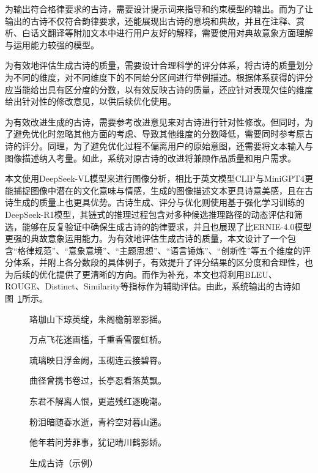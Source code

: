 为输出符合格律要求的古诗，需要设计提示词来指导和约束模型的输出。而为了让输出的古诗不仅符合韵律要求，还能展现出古诗的意境和典故，并且在注释、赏析、白话文翻译等附加文本中进行用户友好的解释，需要使用对典故意象方面理解与运用能力较强的模型。

为有效地评估生成古诗的质量，需要设计合理科学的评分体系，将古诗的质量划分为不同的维度，对不同维度下的不同给分区间进行举例描述。根据体系获得的评分应当能给出具有区分度的分数，以有效反映古诗的质量，还应针对表现欠佳的维度给出针对性的修改意见，以供后续优化使用。

为有效改进生成的古诗，需要参考改进意见来对古诗进行针对性修改。但同时，为了避免优化时忽略其他方面的考虑、导致其他维度的分数降低，需要同时参考原古诗的评分。同理，为了避免优化过程不偏离用户的原始意图，还需要将文本输入与图像描述纳入考量。如此，系统对原古诗的改进将兼顾作品质量和用户需求。

本文使用DeepSeek-VL模型来进行图像分析，相比于英文模型CLIP与MiniGPT4更能捕捉图像中潜在的文化意味与情感，生成的图像描述文本更具诗意美感，且在古诗生成的质量上也更具优势。古诗生成、评分与优化则使用基于强化学习训练的DeepSeek-R1模型，其链式的推理过程包含对多种候选推理路径的动态评估和筛选，能够在反复验证中确保生成古诗的韵律要求，并且也展现了比ERNIE-4.0模型更强的典故意象运用能力。为有效地评估生成古诗的质量，本文设计了一个包含“格律规范”、“意象意境”、“主题思想”、“语言锤炼”、“创新性”等五个维度的评分体系，并附上各分数段的具体例子，有效提升了评分结果的区分度和合理性，也为后续的优化提供了更清晰的方向。而作为补充，本文也将利用BLEU、ROUGE、Distinct、Similarity等指标作为辅助评估。由此，系统输出的古诗如图~\ref{fig:example_poem}所示。

\begin{figure}[ht]
  \centering
  \begin{tcolorbox}[
      colback=white,
      colframe=black,
      boxrule=1pt,
      arc=0mm,
      width=0.6\linewidth,  %
      ]
      \kaishu
      \centering
      珞珈山下琼英绽，朱阁檐前翠影摇。\par
      万点飞花迷画槛，千重香雪覆虹桥。\par
      琉璃映日浮金阙，玉砌连云接碧霄。\par
      曲径曾携书卷过，长亭忍看落英飘。\par
      东君不解离人恨，更遣残红逐晚潮。\par
      粉泪暗随春水逝，青衿空对暮山遥。\par
      他年若问芳菲事，犹记晴川鹤影娇。\par
  \end{tcolorbox}
  \caption{生成古诗（示例）}
  \label{fig:example_poem}
\end{figure}

